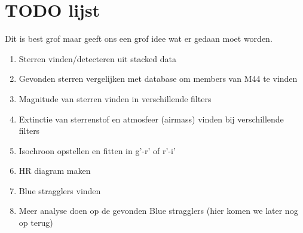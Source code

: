 \documentclass[11pt,a4paper]{article}
\begin{document}
\section{TODO lijst}
Dit is best grof maar geeft ons een grof idee wat er gedaan moet worden.
\begin{enumerate}
\item Sterren vinden/detecteren uit stacked data
\item Gevonden sterren vergelijken met database om members van M44 te vinden
\item Magnitude van sterren vinden in verschillende filters
\item Extinctie van sterrenstof en atmosfeer (airmass) vinden bij verschillende filters
\item Isochroon opstellen en fitten in g’-r’ of r’-i’
\item HR diagram maken
\item Blue stragglers vinden
\item Meer analyse doen op de gevonden Blue stragglers (hier komen we later nog op terug)



\end{enumerate}
\end{document}
